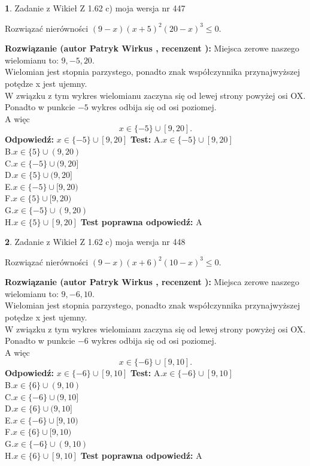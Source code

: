 \documentclass[12pt, a4paper]{article}
\theoremstyle{definition} %
\newtheorem{zad}{}
\newcommand{\zadStart}[1]{\begin{zad}#1\newline}
\newcommand{\zadStop}{\end{zad}}
\newcommand{\rozwStart}[2]{\noindent \textbf{Rozwiązanie (autor #1 , recenzent #2): }\newline}
\newcommand{\rozwStop}{\newline}
\newcommand{\odpStart}{\noindent \textbf{Odpowiedź:}\newline}
\newcommand{\odpStop}{\newline}
\newcommand{\testStart}{\noindent \textbf{Test:}\newline}
\newcommand{\testStop}{\newline}
\newcommand{\kluczStart}{\noindent \textbf{Test poprawna odpowiedź:}\newline}
\newcommand{\kluczStop}{\newline}
\begin{document}
\zadStart{Zadanie z Wikieł Z 1.62 c) moja wersja nr 447}

Rozwiązać nierówności $(9-x)(x+5)^{2}(20-x)^{3}\le0$.
\zadStop
\rozwStart{Patryk Wirkus}{}
Miejsca zerowe naszego wielomianu to: $9, -5, 20$.\\
Wielomian jest stopnia parzystego, ponadto znak współczynnika przy\linebreak najwyższej potędze x jest ujemny.\\ W związku z tym wykres wielomianu zaczyna się od lewej strony powyżej osi OX.\\
Ponadto w punkcie $-5$ wykres odbija się od osi poziomej.\\
A więc $$x \in \{-5\} \cup [9,20].$$
\rozwStop
\odpStart
$x \in \{-5\} \cup [9,20]$
\odpStop
\testStart
A.$x \in \{-5\} \cup [9,20]$\\
B.$x \in \{5\} \cup (9,20)$\\
C.$x \in \{-5\} \cup (9,20]$\\
D.$x \in \{5\} \cup (9,20]$\\
E.$x \in \{-5\} \cup [9,20)$\\
F.$x \in \{5\} \cup [9,20)$\\
G.$x \in \{-5\} \cup (9,20)$\\
H.$x \in \{5\} \cup [9,20]$
\testStop
\kluczStart
A
\kluczStop



\zadStart{Zadanie z Wikieł Z 1.62 c) moja wersja nr 448}

Rozwiązać nierówności $(9-x)(x+6)^{2}(10-x)^{3}\le0$.
\zadStop
\rozwStart{Patryk Wirkus}{}
Miejsca zerowe naszego wielomianu to: $9, -6, 10$.\\
Wielomian jest stopnia parzystego, ponadto znak współczynnika przy\linebreak najwyższej potędze x jest ujemny.\\ W związku z tym wykres wielomianu zaczyna się od lewej strony powyżej osi OX.\\
Ponadto w punkcie $-6$ wykres odbija się od osi poziomej.\\
A więc $$x \in \{-6\} \cup [9,10].$$
\rozwStop
\odpStart
$x \in \{-6\} \cup [9,10]$
\odpStop
\testStart
A.$x \in \{-6\} \cup [9,10]$\\
B.$x \in \{6\} \cup (9,10)$\\
C.$x \in \{-6\} \cup (9,10]$\\
D.$x \in \{6\} \cup (9,10]$\\
E.$x \in \{-6\} \cup [9,10)$\\
F.$x \in \{6\} \cup [9,10)$\\
G.$x \in \{-6\} \cup (9,10)$\\
H.$x \in \{6\} \cup [9,10]$
\testStop
\kluczStart
A
\kluczStop
\end{document}
